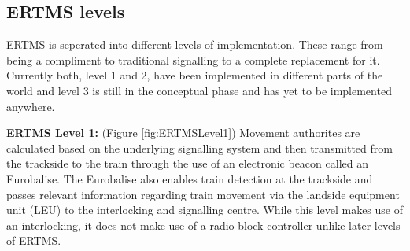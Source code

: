 \subsection*{ERTMS levels}
ERTMS is seperated into different levels of implementation. These range from being a compliment to traditional signalling to a complete replacement for it. Currently both, level 1 and 2, have been implemented in different parts of the world and level 3 is still in the conceptual phase and has yet to be implemented anywhere.

\textbf{ERTMS Level 1:} (Figure \ref{fig:ERTMSLevel1}) Movement authorites are calculated based on the underlying signalling system and then transmitted from the trackside to the train through the use of an electronic beacon called an Eurobalise.  The Eurobalise also enables train detection at the trackside and passes relevant information regarding train movement via the landside equipment unit (LEU) to the interlocking and signalling centre. While this level makes use of an interlocking,  it does not make use of a radio block controller unlike later levels of ERTMS.  \\



